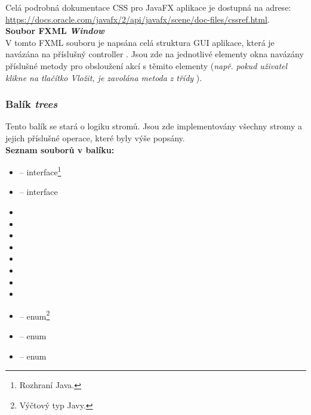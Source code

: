 \documentclass[
  biblatex=false,
  font=serif,
  glossaries=false,
  tables=false,
  theorems=false,
  index
]{kidiplom}
\begin{document}
\noindent Celá podrobná dokumentace CSS pro JavaFX aplikace je dostupná na adrese: \\
\url{https://docs.oracle.com/javafx/2/api/javafx/scene/doc-files/cssref.html}.\\

\noindent \textbf{Soubor FXML \textit{Window}}\\
\indent V tomto FXML souboru je napsána celá struktura GUI aplikace, která je navázána na příslušný controller . Jsou zde na jednotlivé elementy okna navázány příslušné metody pro obsloužení akcí s těmito elementy (\textit{např. pokud uživatel klikne na tlačítko Vložit, je zavolána metoda}  \textit{z třídy} ).\\

\subsubsection{Balík \textit{trees}}
\indent\indent Tento balík se stará o logiku stromů. Jsou zde implementovány všechny stromy a jejich příslušné operace, které byly výše popsány.\\

\noindent \textbf{Seznam souborů v balíku:}
\begin{itemize}
\item {} -- interface\footnote{Rozhraní Java.}
\item {} -- interface
\item {}
\item {}
\item {}
\item {}
\item {}
\item {}
\item {}
\item {}
\item {} -- enum\footnote{Výčtový typ Javy.}
\item {} -- enum
\item {} -- enum
\end{itemize}
\end{document}
